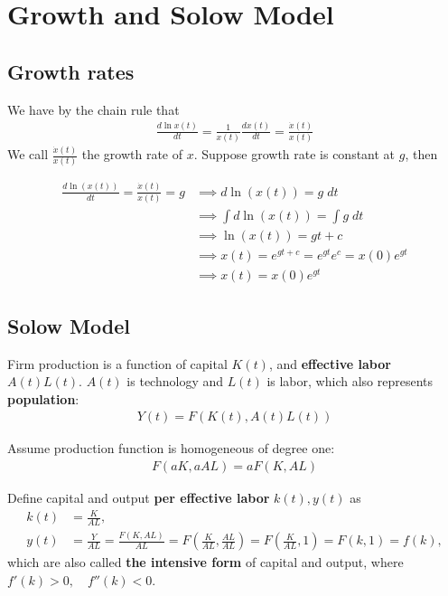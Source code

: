 \documentclass[../main.tex]{subfiles}
\begin{document}
    \chapter{Growth and Solow Model}
        
        \section{Growth rates}
        We have by the chain rule that
        \begin{align}
            \frac{ d\ln{x(t)} }{ dt }
            = \frac{ 1 }{ x(t) } \frac{ dx(t) }{ dt }
            = \frac{ \dot{x}(t) }{ x(t) }
        \end{align}
        We call $\frac{\dot{x}(t) }{ x(t) }$ the growth rate of $x$. Suppose growth rate is constant at $g$, then
        
        \begin{align}
            \frac{d \ln(x(t))}{dt}
            = \frac{\dot x(t)}{x(t)} = g
            &\implies 
            d \ln(x(t)) = g \;dt
            \\
            &\implies 
            \int d \ln(x(t)) = \int g \; dt
            \\
            &\implies 
            \ln(x(t)) =  gt + c
            \\
            &\implies 
            x(t) =  e^{gt + c} = e^{gt}e^c = x(0)e^{gt}
            \\
            &\implies 
            x(t) = x(0)e^{gt}
        \end{align}
        
        \section{Solow Model}
        
        
        Firm production is a function of capital $K(t)$, and \textbf{effective labor} $A(t)L(t)$. $A(t)$ is technology and $L(t)$ is labor, which also represents \textbf{population}:
        \begin{align}
            Y(t) = F(K(t), A(t) L(t))
        \end{align}
        
        Assume production function is homogeneous of degree one:
        \begin{align}
            F(a K, a A L) = a F(K, A L)
        \end{align}
        
        Define capital and output \textbf{per effective labor} $k(t), y(t)$ as
        \begin{align}
            k(t) &= \frac{K}{AL},
            \\
            y(t) &= \frac{Y}{AL}
            = \frac{F(K, AL)}{AL}
            = F\left(\frac{K}{AL}, \frac{AL}{AL}\right)
            = F\left(\frac{K}{AL}, 1\right)
            = F(k, 1) = f(k),
        \end{align}
        which are also called \textbf{the intensive form} of capital and output, where $f'(k) > 0, \quad f''(k) < 0$.
        
\end{document}

